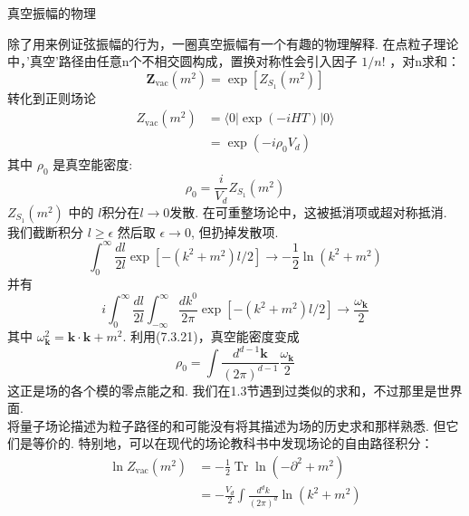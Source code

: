 \centerline{\Large 真空振幅的物理}
除了用来例证弦振幅的行为，一圈真空振幅有一个有趣的物理解释. 在点粒子理论中，'真空'路径由任意n个不相交圆构成，置换对称性会引入因子 $1 / n !$ ，对n求和：
\begin{equation}
	\boldsymbol{Z}_{\mathrm{vac}}\left(m^{2}\right)=\exp \left[Z_{S_{1}}\left(m^{2}\right)\right]
\end{equation}
转化到正则场论
\begin{equation}
	\begin{aligned}
		Z_{\mathrm{vac}}\left(m^{2}\right) &=\langle 0|\exp (-i H T)| 0\rangle \\
		&=\exp \left(-i \rho_{0} V_{d}\right)
	\end{aligned}
\end{equation}
其中 $\rho_{0}$ 是真空能密度:
\begin{equation}
	\rho_{0}=\frac{i}{V_{d}} Z_{S_{1}}\left(m^{2}\right)
\end{equation}
 $Z_{S_{1}}\left(m^{2}\right)$ 中的 $l$积分在$l \rightarrow 0 $发散. 在可重整场论中，这被抵消项或超对称抵消. 我们截断积分 $l \geq \epsilon$ 然后取 $\epsilon \rightarrow 0$, 但扔掉发散项. 
\begin{equation}
	\int_{0}^{\infty} \frac{d l}{2 l} \exp \left[-\left(k^{2}+m^{2}\right) l / 2\right] \rightarrow-\frac{1}{2} \ln \left(k^{2}+m^{2}\right)
\end{equation}
并有
\begin{equation}
	i \int_{0}^{\infty} \frac{d l}{2 l} \int_{-\infty}^{\infty} \frac{d k^{0}}{2 \pi} \exp \left[-\left(k^{2}+m^{2}\right) l / 2\right] \rightarrow \frac{\omega_{\mathbf{k}}}{2}
\end{equation}
其中 $\omega_{\mathbf{k}}^{2}=\mathbf{k} \cdot \mathbf{k}+m^{2}$. 利用(7.3.21)，真空能密度变成
\begin{equation}
	\rho_{0}=\int \frac{d^{d-1} \mathbf{k}}{(2 \pi)^{d-1}} \frac{\omega_{\mathbf{k}}}{2}
\end{equation}
这正是场的各个模的零点能之和. 我们在1.3节遇到过类似的求和，不过那里是世界面.\\
将量子场论描述为粒子路径的和可能没有将其描述为场的历史求和那样熟悉. 但它们是等价的. 特别地，可以在现代的场论教科书中发现场论的自由路径积分： 
\begin{equation}
	\begin{aligned}
		\ln Z_{\mathrm{vac}}\left(m^{2}\right) &=-\frac{1}{2} \operatorname{Tr} \ln \left(-\partial^{2}+m^{2}\right) \\
		&=-\frac{V_{d}}{2} \int \frac{d^{d} k}{(2 \pi)^{d}} \ln \left(k^{2}+m^{2}\right)
	\end{aligned}
\end{equation}
